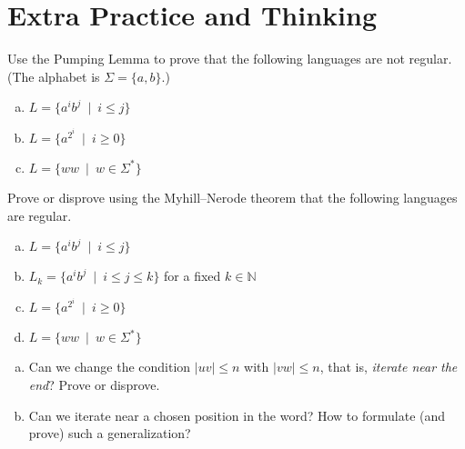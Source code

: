 \documentclass[a4paper,12pt]{amsart}
\begin{document}
\section*{Extra Practice and Thinking}


\medskip\begin{problem}
    
    Use the Pumping Lemma to prove that the following languages are not regular. (The alphabet is $\Sigma=\{a,b\}$.)
          
    \begin{enumerate}[(a)]\setlength\itemsep{6pt}
        \item $L=\{a^ib^j\ \mid\ i\leq j\}$        
        \item $L=\{a^{2^i}\ \mid\ i\geq 0\}$
        \item $L=\{ww\ \mid \ w\in\Sigma^*\}$
    \end{enumerate}
    
\end{problem}


\medskip\begin{problem}

    Prove or disprove using the Myhill--Nerode theorem that the following languages are regular.
    \begin{enumerate}[(a)]\setlength\itemsep{6pt}
        \item $L=\{a^ib^j\ \mid\ i\leq j\}$
        \item $L_k=\{a^ib^j\ \mid\ i\leq j\leq k\}$ for a fixed $k\in\mathbb N$
        \item $L=\{a^{2^i}\ \mid\ i\geq 0\}$
        \item $L=\{ww\ \mid \ w\in\Sigma^*\}$
    \end{enumerate}

\end{problem}


\medskip\begin{problem}
    
    \begin{enumerate}[(a)]\setlength\itemsep{6pt}
        \item Can we change the condition $|uv|\leq n$ with $|vw|\leq n$, that is, \emph{iterate near the end}? Prove or disprove.
        \item Can we iterate near a chosen position in the word? How to formulate (and prove) such a generalization?
    \end{enumerate}
    
\end{problem}
\end{document}
